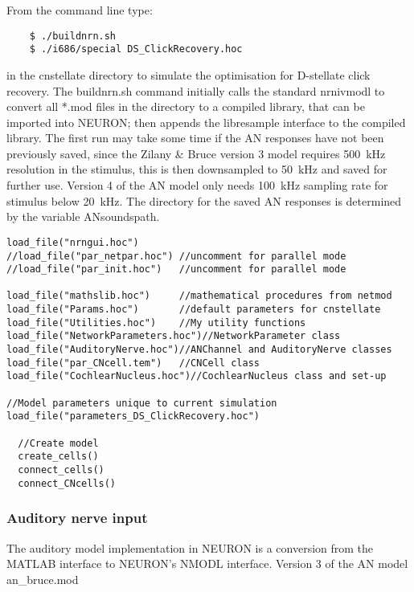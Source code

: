 From the command line type:
\begin{verbatim}
    $ ./buildnrn.sh
    $ ./i686/special DS_ClickRecovery.hoc
\end{verbatim}
in the \textsf{cnstellate} directory to simulate the optimisation for D-stellate
click recovery.  The \textsf{buildnrn.sh} command initially calls the standard
\textsf{nrnivmodl} to convert all *.mod files in the directory to a compiled
library, that can be imported into NEURON; then appends the libresample
interface to the compiled library. The 
first run may take some time if the AN
responses have not been previously saved, since the Zilany \& Bruce version 3
model requires 500~kHz resolution in the stimulus, this is then downsampled to
50~kHz and saved for further use. Version 4 of the AN model
\citep{ZilanyBruceEtAl:2009} only needs 100~kHz sampling rate for stimulus below
20~kHz. The directory for the saved AN responses is determined by the variable
\textsf{ANsoundspath}.

\begin{lstlisting}[label=lst:headerlines,caption={Headerlines in
    \mbox{\textsf{DS\_ClickRecovery\.hoc}} show a typical setup in a
    \textsf{cnstellate} setup.}]
load_file("nrngui.hoc")
//load_file("par_netpar.hoc") //uncomment for parallel mode
//load_file("par_init.hoc")   //uncomment for parallel mode

load_file("mathslib.hoc")     //mathematical procedures from netmod
load_file("Params.hoc")       //default parameters for cnstellate  
load_file("Utilities.hoc")    //My utility functions 
load_file("NetworkParameters.hoc")//NetworkParameter class
load_file("AuditoryNerve.hoc")//ANChannel and AuditoryNerve classes 
load_file("par_CNcell.tem")   //CNCell class
load_file("CochlearNucleus.hoc")//CochlearNucleus class and set-up

//Model parameters unique to current simulation
load_file("parameters_DS_ClickRecovery.hoc") 

  //Create model
  create_cells()
  connect_cells()
  connect_CNcells()
\end{lstlisting}


\subsubsection{Auditory nerve input}

The auditory model implementation in NEURON is a conversion from the MATLAB
interface to NEURON's NMODL interface. Version 3 of the AN model
\mbox{\textsf{an\_bruce.mod}}

